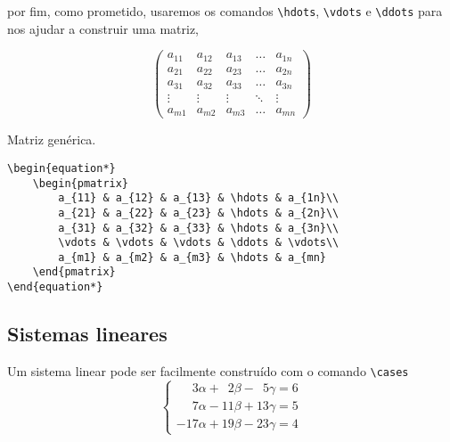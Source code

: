 \newpage
\noindent por fim, como prometido, usaremos os comandos \verb|\hdots|, \verb|\vdots| e \verb|\ddots| para nos ajudar a construir uma matriz,

\begin{equation*}
    \begin{pmatrix}
        a_{11} & a_{12} & a_{13} & \hdots & a_{1n}\\
        a_{21} & a_{22} & a_{23} & \hdots & a_{2n}\\
        a_{31} & a_{32} & a_{33} & \hdots & a_{3n}\\
        \vdots & \vdots & \vdots & \ddots & \vdots\\
        a_{m1} & a_{m2} & a_{m3} & \hdots & a_{mn}
    \end{pmatrix}
\end{equation*}

\begin{programcode}{Matriz genérica.}
\vspace{-0.5 cm}
\begin{verbatim}
\begin{equation*}
    \begin{pmatrix}
        a_{11} & a_{12} & a_{13} & \hdots & a_{1n}\\
        a_{21} & a_{22} & a_{23} & \hdots & a_{2n}\\
        a_{31} & a_{32} & a_{33} & \hdots & a_{3n}\\
        \vdots & \vdots & \vdots & \ddots & \vdots\\
        a_{m1} & a_{m2} & a_{m3} & \hdots & a_{mn}
    \end{pmatrix}
\end{equation*}
\end{verbatim}
\end{programcode}

\subsection{Sistemas lineares}
Um sistema linear pode ser facilmente constru\'{i}do com o comando \verb|\cases|
\begin{equation*}
    \begin{cases}
        \phantom{-1}3\alpha + \phantom{1}2\beta - \phantom{1}5 \gamma = 6\\
        \phantom{-1}7\alpha - 11\beta + 13 \gamma = 5\\
        -17\alpha + 19\beta - 23 \gamma = 4
    \end{cases}
\end{equation*}


